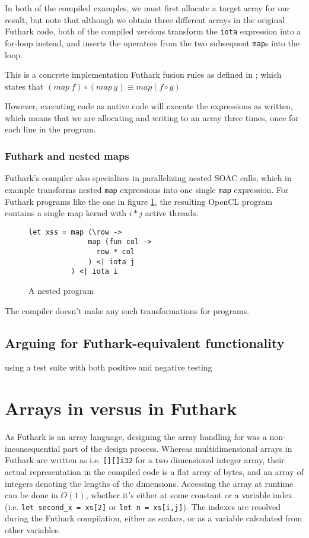 In both of the compiled examples, we must first allocate a target array for our
result, but note that although we obtain three different arrays in the original
Futhark code, both of the compiled versions transform the \texttt{iota}
expression into a for-loop instead, and inserts the operators from the two
subsequent \texttt{map}s into the loop.

This is a concrete implementation Futhark fusion rules as defined in \cite{pldi17}; which states
that $(map~f) \circ (map~g) \equiv map (f \circ g)$

However, executing \fshark{} code as native \fsharp{} code will execute the
expressions as written, which means that we are allocating and writing to an
array three times, once for each line in the program.

\subsubsection*{Futhark and nested maps}
Futhark's compiler also specializes in parallelizing nested SOAC
calls\cite{pldi17}, which in example transforms nested \texttt{map} expressions into one
single \texttt{map} expression. For Futhark programs like the one in figure
\ref{fig:fsharpnested}, the resulting OpenCL program contains a single map
kernel with $i * j$ active threads.

\begin{figure}[h]
  \centering
\begin{verbatim}
let xss = map (\row ->
              map (fun col ->
                row * col
              ) <| iota j
          ) <| iota i
\end{verbatim}
  \caption{A nested \fshark{} program}
  \label{fig:fsharpnested}
\end{figure}

The \fsharp{} compiler doesn't make any such transformations for \fshark{} programs.

\subsection*{Arguing for Futhark-equivalent functionality}
using a test suite with both positive and negative testing

\section{Arrays in \fsharp{} versus in Futhark}
As Futhark is an array language, designing the array handling for \fshark{} was
a non-inconsequential part of the design process.
Whereas multidimensional arrays in Futhark are written as i.e. \texttt{[][]i32}
for a two dimensional integer array, their actual representation in the compiled
code is a flat array of bytes, and an array of integers denoting the lengths of
the dimensions.
Accessing the array at runtime can be done in $O(1)$, whether it's
either at some constant or a variable index (i.e. \texttt{let second\_x = xs[2]} or \texttt{let n = xs[i,j]}).
The indexes are resolved during the Futhark compilation, either as scalars, or
as a variable calculated from other variables.

